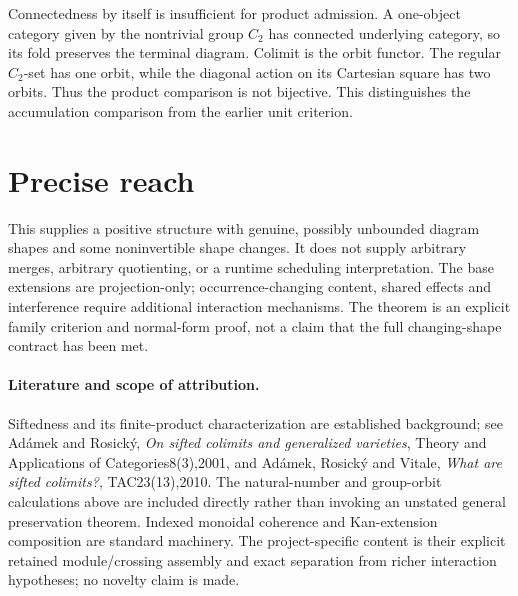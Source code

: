 \documentclass[11pt]{article}
\begin{document}
Connectedness by itself is insufficient for product admission. A one-object category given by the nontrivial group $C_2$ has connected underlying category, so its fold preserves the terminal diagram. Colimit is the orbit functor. The regular $C_2$-set has one orbit, while the diagonal action on its Cartesian square has two orbits. Thus the product comparison is not bijective. This distinguishes the accumulation comparison from the earlier unit criterion.

\section{Precise reach}
This supplies a positive structure with genuine, possibly unbounded diagram shapes and some noninvertible shape changes. It does not supply arbitrary merges, arbitrary quotienting, or a runtime scheduling interpretation. The base extensions are projection-only; occurrence-changing content, shared effects and interference require additional interaction mechanisms. The theorem is an explicit family criterion and normal-form proof, not a claim that the full changing-shape contract has been met.
\paragraph{Literature and scope of attribution.} Siftedness and its finite-product characterization are established background; see Ad\'amek and Rosick\'y, \emph{On sifted colimits and generalized varieties}, Theory and Applications of Categories8(3),2001, and Ad\'amek, Rosick\'y and Vitale, \emph{What are sifted colimits?}, TAC23(13),2010. The natural-number and group-orbit calculations above are included directly rather than invoking an unstated general preservation theorem. Indexed monoidal coherence and Kan-extension composition are standard machinery. The project-specific content is their explicit retained module/crossing assembly and exact separation from richer interaction hypotheses; no novelty claim is made.
\end{document}
